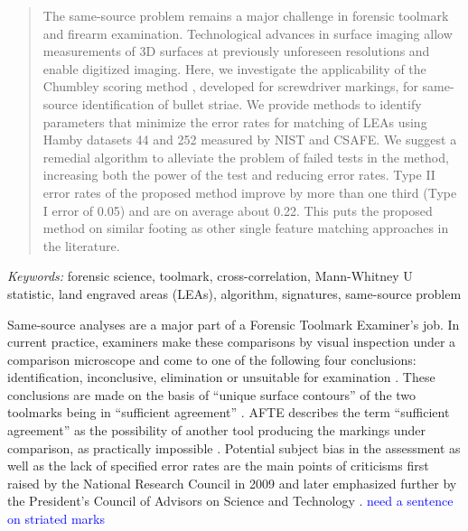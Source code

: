 \documentclass[12pt]{article}
\begin{document}
\bigskip
\begin{abstract}
The same-source problem remains a major challenge in forensic toolmark
and firearm examination. Technological advances in surface imaging allow
measurements of 3D surfaces at previously unforeseen resolutions and
enable digitized imaging. Here, we investigate the applicability of the
Chumbley scoring method \cite{hadler}, developed for screwdriver
markings, for same-source identification of bullet striae. We provide
methods to identify parameters that minimize the error rates for
matching of LEAs using Hamby datasets 44 and 252 measured by NIST and
CSAFE. We suggest a remedial algorithm to alleviate the problem of
failed tests in the method, increasing both the power of the test and
reducing error rates. Type II error rates of the proposed method improve
by more than one third (Type I error of 0.05) and are on average about
0.22. This puts the proposed method on similar footing as other single
feature matching approaches in the literature.
\end{abstract}

\noindent%
{\it Keywords:} forensic science, toolmark, cross-correlation, Mann-Whitney U statistic, land engraved areas (LEAs), algorithm, signatures, same-source problem
\vfill

\newpage
{} %

\newcommand{\hh}[1]{{\textcolor{orange}{#1}}}
\newcommand{\gk}[1]{{\textcolor{blue}{#1}}}
\newcommand{\cited}[1]{{\textcolor{red}{#1}}}
\setlength\parindent{0pt}

\newpage

Same-source analyses are a major part of a Forensic Toolmark Examiner's
job. In current practice, examiners make these comparisons by visual
inspection under a comparison microscope and come to one of the
following four conclusions: identification, inconclusive, elimination or
unsuitable for examination \cite{afte-toolmarks1998}. These conclusions
are made on the basis of ``unique surface contours'' of the two
toolmarks being in ``sufficient agreement'' \cite{afte-toolmarks1998}.
AFTE describes the term ``sufficient agreement'' as the possibility of
another tool producing the markings under comparison, as practically
impossible \cite{afte-toolmarks1998}. Potential subject bias in the
assessment as well as the lack of specified error rates are the main
points of criticisms first raised by the National Research Council in
2009 \cite{NAS:2009} and later emphasized further by the President's
Council of Advisors on Science and Technology \cite{pcast2016}.
{\textcolor{blue}{need a sentence on striated marks}}
\end{document}

